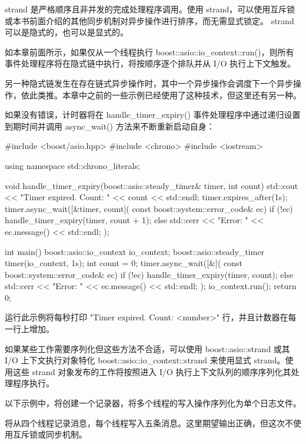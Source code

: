 strand 是严格顺序且非并发的完成处理程序调用。使用 strand，可以使用互斥锁或本书前面介绍的其他同步机制对异步操作进行排序，而无需显式锁定。 strand 可以是隐式的，也可以是显式的。

如本章前面所示，如果仅从一个线程执行 boost::asio::io\_context::run()，则所有事件处理程序将在隐式链中执行，将按顺序逐个排队并从 I/O 执行上下文触发。

另一种隐式链发生在存在链式异步操作时，其中一个异步操作会调度下一个异步操作，依此类推。本章中之前的一些示例已经使用了这种技术，但这里还有另一种。

如果没有错误，计时器将在 handle\_timer\_expiry() 事件处理程序中通过递归设置到期时间并调用 async\_wait() 方法来不断重新启动自身：

\begin{cpp}
#include <boost/asio.hpp>
#include <chrono>
#include <iostream>

using namespace std::chrono_literals;

void handle_timer_expiry(boost::asio::steady_timer& timer,
                         int count) {
    std::cout << "Timer expired. Count: " << count
    << std::endl;
    timer.expires_after(1s);
    timer.async_wait([&timer, count](
                const boost::system::error_code& ec) {
        if (!ec) {
            handle_timer_expiry(timer, count + 1);
        } else {
            std::cerr << "Error: " << ec.message()
                      << std::endl;
        }
    });
}

int main() {
    boost::asio::io_context io_context;
    boost::asio::steady_timer timer(io_context, 1s);
    int count = 0;
    timer.async_wait([&](
                const boost::system::error_code& ec) {
        if (!ec) {
            handle_timer_expiry(timer, count);
        } else {
            std::cerr << "Error: " << ec.message()
                      << std::endl;
        }
    });
    io_context.run();
    return 0;
}
\end{cpp}

运行此示例将每秒打印 "Timer expired. Count: <number>" 行，并且计数器在每一行上增加。

如果某些工作需要序列化但这些方法不合适，可以使用 boost::asio::strand 或其 I/O 上下文执行对象特化 boost::asio::io\_context::strand 来使用显式 strand。使用这些 strand 对象发布的工作将按照进入 I/O 执行上下文队列的顺序序列化其处理程序执行。

以下示例中，将创建一个记录器，将多个线程的写入操作序列化为单个日志文件。

将从四个线程记录消息，每个线程写入五条消息。这里期望输出正确，但这次不使用互斥锁或同步机制。

